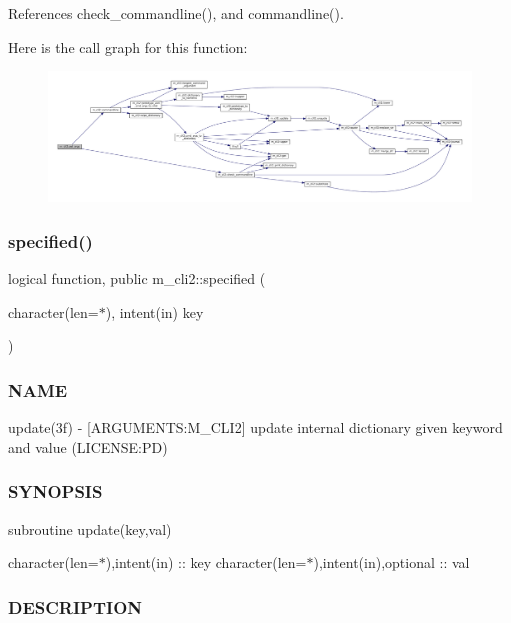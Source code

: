 References check\+\_\+commandline(), and commandline().

Here is the call graph for this function\+:\nopagebreak
\begin{figure}[H]
\begin{center}
\leavevmode
\includegraphics[width=350pt]{namespacem__cli2_a6d20994aa80217dd3d0ffd1d5586f736_cgraph}
\end{center}
\end{figure}
\mbox{\label{namespacem__cli2_a2b85feed10ad5507a7181c5434c46541}} 
\subsubsection{\texorpdfstring{specified()}{specified()}}
{\footnotesize\ttfamily logical function, public m\+\_\+cli2\+::specified (\begin{DoxyParamCaption}\item[{character(len=$\ast$), intent(in)}]{key }\end{DoxyParamCaption})}



\subsubsection*{N\+A\+ME}

update(3f) -\/ \mbox{[}A\+R\+G\+U\+M\+E\+N\+TS\+:M\+\_\+\+C\+L\+I2\mbox{]} update internal dictionary given keyword and value (L\+I\+C\+E\+N\+SE\+:PD) \subsubsection*{S\+Y\+N\+O\+P\+S\+IS}

subroutine update(key,val)

character(len=$\ast$),intent(in) \+:\+: key character(len=$\ast$),intent(in),optional \+:\+: val \subsubsection*{D\+E\+S\+C\+R\+I\+P\+T\+I\+ON}

